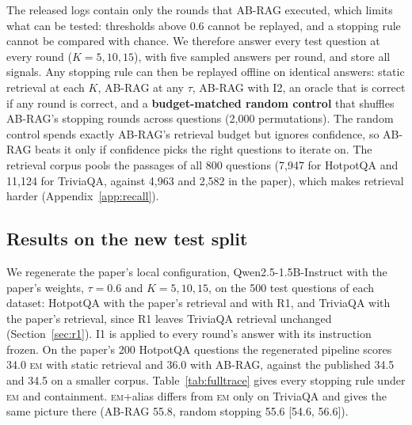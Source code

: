 \documentclass[11pt]{article}
\newcommand{\EM}{\textsc{em}}
\begin{document}
The released logs contain only the rounds that AB-RAG executed, which limits what can be tested: thresholds above 0.6 cannot be replayed, and a stopping rule cannot be compared with chance. We therefore answer every test question at every round ($K = 5, 10, 15$), with five sampled answers per round, and store all signals. Any stopping rule can then be replayed offline on identical answers: static retrieval at each $K$, AB-RAG at any $\tau$, AB-RAG with I2, an oracle that is correct if any round is correct, and a \textbf{budget-matched random control} that shuffles AB-RAG's stopping rounds across questions (2{,}000 permutations). The random control spends exactly AB-RAG's retrieval budget but ignores confidence, so AB-RAG beats it only if confidence picks the right questions to iterate on. The retrieval corpus pools the passages of all 800 questions (7,947 for HotpotQA and 11,124 for TriviaQA, against 4,963 and 2,582 in the paper), which makes retrieval harder (Appendix~\ref{app:recall}).

\subsection{Results on the new test split}

We regenerate the paper's local configuration, Qwen2.5-1.5B-Instruct with the paper's weights, $\tau = 0.6$ and $K = 5, 10, 15$, on the 500 test questions of each dataset: HotpotQA with the paper's retrieval and with R1, and TriviaQA with the paper's retrieval, since R1 leaves TriviaQA retrieval unchanged (Section~\ref{sec:r1}). I1 is applied to every round's answer with its instruction frozen. On the paper's 200 HotpotQA questions the regenerated pipeline scores 34.0 \EM{} with static retrieval and 36.0 with AB-RAG, against the published 34.5 and 34.5 on a smaller corpus. Table~\ref{tab:fulltrace} gives every stopping rule under \EM{} and containment. \EM{}+alias differs from \EM{} only on TriviaQA and gives the same picture there (AB-RAG 55.8, random stopping 55.6 [54.6, 56.6]).
\end{document}
